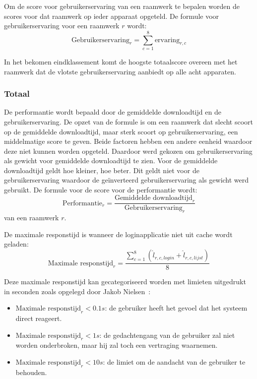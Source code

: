 Om de score voor gebruikerservaring van een raamwerk te bepalen worden de scores voor dat raamwerk op ieder apparaat opgeteld. De formule voor gebruikerservaring voor een raamwerk $r$ wordt:
\begin{equation}
  \text{Gebruikerservaring}_r = \sum_{c=1}^{8}{\text{ervaring}_{r,c}}
  \label{eq:performantie-gebruikservaring}
\end{equation}

In het bekomen eindklassement komt de hoogste totaalscore overeen met het raamwerk dat de vlotste gebruikerservaring aanbiedt op alle acht apparaten. 

\subsubsection{Totaal}
De performantie wordt bepaald door de gemiddelde downloadtijd en de gebruikerservaring.
De opzet van de formule is om een raamwerk dat slecht scoort op de gemiddelde downloadtijd, maar sterk scoort op gebruikerservaring, een middelmatige score te geven.
Beide factoren hebben een andere eenheid waardoor deze niet kunnen worden opgeteld.
Daardoor werd gekozen om gebruikerservaring als gewicht voor gemiddelde downloadtijd te zien.
Voor de gemiddelde downloadtijd geldt hoe kleiner, hoe beter.
Dit geldt niet voor de gebruikerservaring waardoor de geïnverteerd gebruikerservaring als gewicht werd gebruikt.
De formule voor de score voor de performantie wordt:
\begin{equation}
  \text{Performantie}_r = \frac{\text{Gemiddelde downloadtijd}_r}{\text{Gebruikerservaring}_r}
  \label{eq:performantie-enhanced}
\end{equation}
van een raamwerk $r$. 


De maximale responstijd is wanneer de loginapplicatie niet uit cache wordt geladen:
\begin{equation}
  \text{Maximale responstijd}_r= \frac{\sum\limits_{c=1}^{8}\left(\widehat{l}_{r,c,login} + \widehat{l}_{r,c,lijst}\right)}{8}
  \label{eq:performantie-max}
\end{equation}

Deze maximale responstijd kan gecategoriseerd worden met limieten uitgedrukt in seconden zoals opgelegd door Jakob Nielsen~\cite{Nielsen1993}:  
\begin{itemize}
\item $\text{Maximale responstijd}_r < 0.1\unit{s}$: de gebruiker heeft het gevoel dat het systeem direct reageert.
\item $\text{Maximale responstijd}_r < 1\unit{s}$: de gedachtengang van de gebruiker zal niet worden onderbroken, maar hij zal toch een vertraging waarnemen.
\item $\text{Maximale responstijd}_r < 10\unit{s}$: de limiet om de aandacht van de gebruiker te behouden.
\end{itemize}


